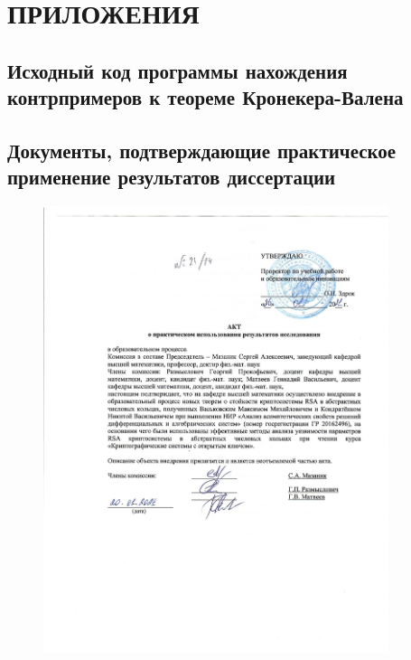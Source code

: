 \documentclass[_00_dissertation.tex]{subfiles}
\begin{document}
\onlyinsubfile{
    \renewcommand{\contentsname}{ОГЛАВЛЕНИЕ}
    \setcounter{tocdepth}{3}
    \tableofcontents
}

\chapter*{ПРИЛОЖЕНИЯ}

\section*{Исходный код программы нахождения контрпримеров к теореме Кронекера-Валена}\label{section:Appendix_code}



\newpage
\section*{Документы, подтверждающие практическое применение результатов диссертации}\label{section:Appendix_counterexample}

\begin{figure}[ht!]
    \centering
    \includegraphics[width=0.9\textwidth]{../additional/Act_KondratyonokNV_page-0001.jpg}
\end{figure}
\end{document}
